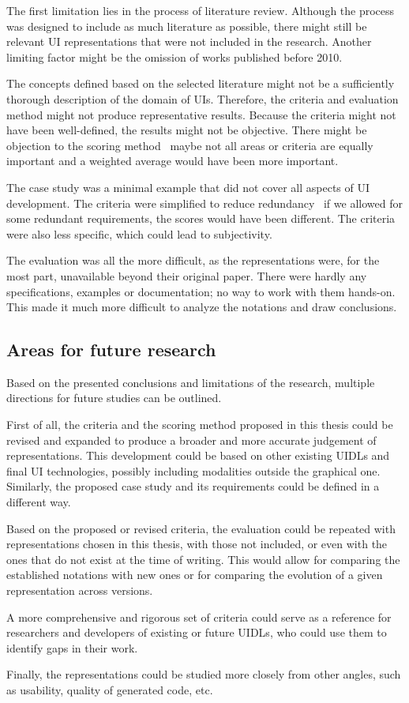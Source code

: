 The first limitation lies in the process of literature review.
Although the process was designed to include as much literature as possible, there might still be relevant UI representations that were not included in the research.
Another limiting factor might be the omission of works published before 2010.

The concepts defined based on the selected literature might not be a sufficiently thorough description of the domain of UIs.
Therefore, the criteria and evaluation method might not produce representative results.
Because the criteria might not have been well-defined, the results might not be objective.
There might be objection to the scoring method \textendash\ maybe not all areas or criteria are equally important and a weighted average would have been more important.

The case study was a minimal example that did not cover all aspects of UI development.
The criteria were simplified to reduce redundancy \textendash\ if we allowed for some redundant requirements, the scores would have been different.
The criteria were also less specific, which could lead to subjectivity.

The evaluation was all the more difficult, as the representations were, for the most part, unavailable beyond their original paper.
There were hardly any specifications, examples or documentation; no way to work with them hands-on.
This made it much more difficult to analyze the notations and draw conclusions.

\subsection{Areas for future research}\label{subsec:areas-for-future-research}

Based on the presented conclusions and limitations of the research, multiple directions for future studies can be outlined.

First of all, the criteria and the scoring method proposed in this thesis could be revised and expanded to produce a broader and more accurate judgement of representations.
This development could be based on other existing UIDLs and final UI technologies, possibly including modalities outside the graphical one.
Similarly, the proposed case study and its requirements could be defined in a different way.

Based on the proposed or revised criteria, the evaluation could be repeated with representations chosen in this thesis, with those not included, or even with the ones that do not exist at the time of writing.
This would allow for comparing the established notations with new ones or for comparing the evolution of a given representation across versions.

A more comprehensive and rigorous set of criteria could serve as a reference for researchers and developers of existing or future UIDLs, who could use them to identify gaps in their work.

Finally, the representations could be studied more closely from other angles, such as usability, quality of generated code, etc.
